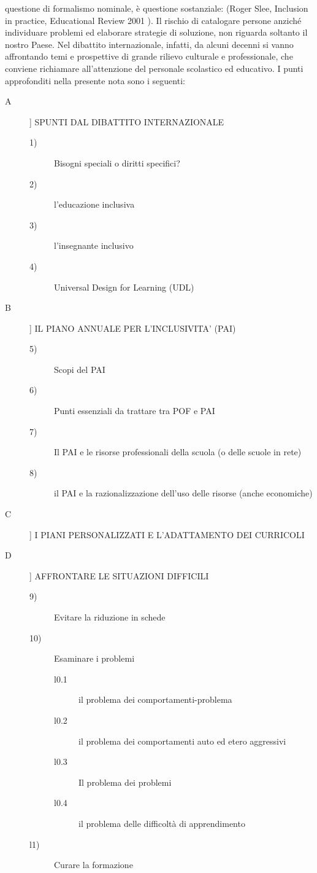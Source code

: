 questione di formalismo nominale, è questione sostanziale: 
(Roger Slee, Inclusion in practice, Educational Review 2001 ).
Il rischio di catalogare persone anziché individuare problemi ed elaborare strategie di soluzione, non
riguarda soltanto il nostro Paese. Nel dibattito internazionale, infatti, da alcuni decenni si vanno
affrontando temi e prospettive di grande rilievo culturale e professionale, che conviene richiamare
all'attenzione del personale scolastico ed educativo.
I punti approfonditi nella presente nota sono i seguenti:
\begin{description}
	\item[A]] SPUNTI DAL DIBATTITO INTERNAZIONALE
	\begin{description}
		\item[1)] Bisogni speciali o diritti specifici?
		\item [2)] l'educazione inclusiva
		\item [3)] l'insegnante inclusivo
		\item [4)] Universal Design for Learning (UDL)
	\end{description} 
	\item [B]] IL PIANO ANNUALE PER L'INCLUSIVITA' (PAI)
	\begin{description}
		\item[5)] Scopi del PAI
		\item [6)] Punti essenziali da trattare tra POF e PAI
		\item [7)] Il PAI e le risorse professionali della scuola (o delle scuole in rete)
		\item [8)] il PAI e la razionalizzazione dell'uso delle risorse (anche economiche)
	\end{description}
	\item [C]] I PIANI PERSONALIZZATI E L'ADATTAMENTO DEI CURRICOLI
	\item [D]] AFFRONTARE LE SITUAZIONI DIFFICILI
	\begin{description}
		\item[9)] Evitare la riduzione in schede
		\item [10)] Esaminare i problemi
		\begin{description}
			\item[l0.1] il problema dei comportamenti-problema
			\item[l0.2] il problema dei comportamenti auto ed etero aggressivi
		  \item[l0.3] Il problema dei problemi 
		  \item[l0.4] il problema delle difficoltà di apprendimento
		\end{description}
		\item[l1)] Curare la formazione
	\end{description}
\end{description}
